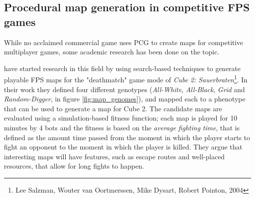 \subsection{Procedural map generation in competitive FPS games}
\label{subsec:pcg_fps}
While no acclaimed commercial game uses PCG to create maps for competitive multiplayer games, some academic research has been done on the topic.

\citeauthor{cardamone_evolving_2011} have started research in this field by using search-based techniques to generate playable FPS maps for the "deathmatch" game mode of \textit{Cube 2: Sauerbraten}\footnote{Lee Salzman, Wouter van Oortmerssen, Mike Dysart, Robert Pointon, 2004}. In their work they defined four different genotypes (\textit{All-White}, \textit{All-Black}, \textit{Grid} and \textit{Random-Digger}, in figure \cref{fig:map_genomes}), and mapped each to a phenotype that can be used to generate a map for Cube 2. The candidate maps are evaluated using a simulation-based fitness function; each map is played for 10 minutes by 4 bots and the fitness is based on the \textit{average fighting time}, that is defined as the amount time passed from the moment in which the player starts to fight an opponent to the moment in which the player is killed. They argue that interesting maps will have features, such as escape routes and well-placed resources, that allow for long fights to happen. \cite{cardamone_evolving_2011}

